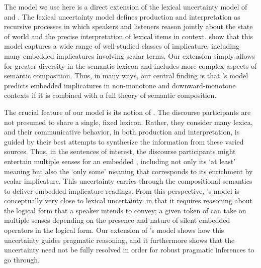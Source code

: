\documentclass[leqno,12pt]{article}
\begin{document}
The model we use here is a direct extension of the lexical uncertainty
model of \citet{Bergen:Goodman:Levy:2012} and
\citet{Bergen:Levy:Goodman:2014}. The lexical uncertainty model
defines production and interpretation as recursive processes in which
speakers and listeners reason jointly about the state of world and the
precise interpretation of lexical items in context.
\citeauthor{Bergen:Levy:Goodman:2014} show that this model captures a
wide range of well-studied classes of implicature, including many
embedded implicatures involving scalar terms. Our extension simply
allows for greater diversity in the semantic lexicon and includes more
complex aspects of semantic composition. Thus, in many ways, our
central finding is that \citeauthor{Bergen:Levy:Goodman:2014}'s model
predicts embedded implicatures in non-monotone and downward-monotone
contexts if it is combined with a full theory of semantic composition.

The crucial feature of our model is its notion of . The discourse participants are not presumed to share a
single, fixed lexicon. Rather, they consider many lexica, and their
communicative behavior, in both production and interpretation, is
guided by their best attempts to synthesize the information from these
varied sources. Thus, in the sentences of interest, the discourse
participants might entertain multiple senses for an embedded
, including not only its `at least' meaning but also the
`only some' meaning that corresponds to its enrichment by scalar
implicature. This uncertainty carries through the compositional
semantics to deliver embedded implicature readings. From this
perspective, \citeauthor{ChierchiaFoxSpector08}'s model is
conceptually very close to lexical uncertainty, in that it requires
reasoning about the logical form that a speaker intends to convey; a
given token of  can take on multiple senses depending on
the presence and nature of silent embedded operators in the logical
form. Our extension of \citeauthor{Bergen:Levy:Goodman:2014}'s model
shows how this uncertainty guides pragmatic reasoning, and it
furthermore shows that the uncertainty need not be fully resolved in
order for robust pragmatic inferences to go through.

\end{document}
